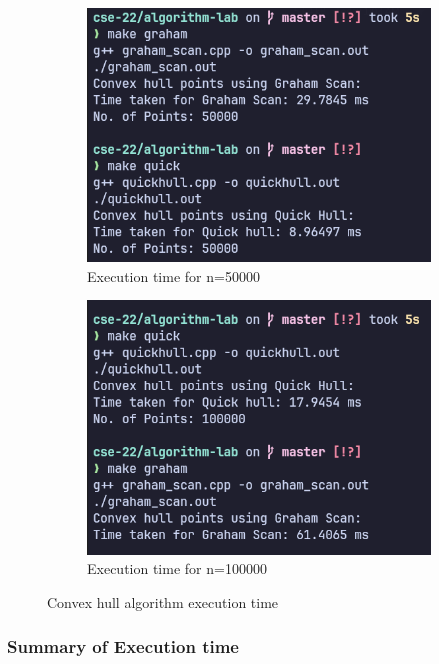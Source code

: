 \begin{figure}[H]
\begin{subfigure}[b]{0.4\textwidth}
        \includegraphics[width=\textwidth]{./img/lab2/p50k.png}
        \caption{Execution time for n=50000}
    \end{subfigure}
    \hfill
    \begin{subfigure}[b]{0.4\textwidth}
        \centering
        \includegraphics[width=\textwidth]{./img/lab2/p1lack.png}
        \caption{Execution time for n=100000}
    \end{subfigure}
    
    \caption{Convex hull algorithm execution time}
    \label{fig:task1}

\end{figure}

\subsubsection*{Summary of Execution time}

